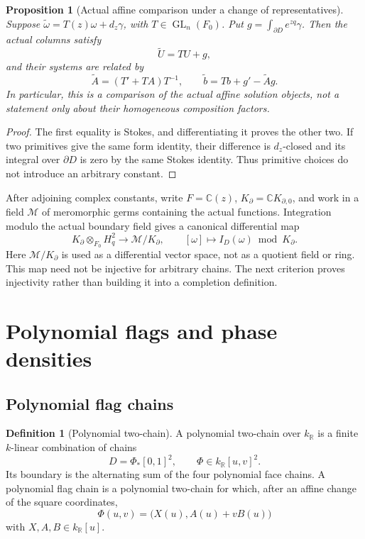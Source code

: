 \documentclass[11pt]{article}
\numberwithin{equation}{section}
\newtheorem{proposition}[proposition]{Proposition}
\theoremstyle{definition}
\newtheorem{definition}[definition]{Definition}
\theoremstyle{remark}
\newcommand{\C}{\mathbb C}
\newcommand{\R}{\mathbb R}
\newcommand{\GL}{\operatorname{GL}}
\newcommand{\Hq}{H_q^2}
\newcommand{\M}{\mathscr M}
\begin{document}
\begin{proposition}[Actual affine comparison under a change of representatives]
\label{prop:gauge}
Suppose
$\widetilde\omega=T(z)\omega+d_z\gamma$, with $T\in\GL_n(F_0)$.
Put $g=\int_{\partial D}e^{zq}\gamma$. Then the actual columns satisfy
\[
 \widetilde U=TU+g,
\]
and their systems are related by
\[
 \widetilde A=(T'+TA)T^{-1},\qquad
 \widetilde b=Tb+g'-\widetilde A g.
\]
In particular, this is a comparison of the actual affine solution objects,
not a statement only about their homogeneous composition factors.
\end{proposition}
\begin{proof}
The first equality is Stokes, and differentiating it proves the other two.
If two primitives give the same form identity, their difference is
$d_z$-closed and its integral over $\partial D$ is zero by the same Stokes
identity. Thus primitive choices do not introduce an arbitrary constant.
\end{proof}

After adjoining complex constants, write $F=\C(z)$,
$K_\partial=\C K_{\partial,0}$, and work in a field $\M$ of meromorphic
germs containing the actual functions. Integration modulo the actual
boundary field gives a canonical differential map
\begin{equation}\label{eq:canonical-comparison}
 K_\partial\otimes_{F_0}\Hq\longrightarrow\M/K_\partial,
 \qquad [\omega]\longmapsto I_D(\omega)\bmod K_\partial.
\end{equation}
Here $\M/K_\partial$ is used as a differential vector space, not as a
quotient field or ring. This map need not be injective for arbitrary chains.
The next criterion proves injectivity rather than building it into a
completion definition.

\section{Polynomial flags and phase densities}\label{sec:flags}

\subsection{Polynomial flag chains}

\begin{definition}[Polynomial two-chain]\label{def:poly-chain}
A polynomial two-chain over $k_{\R}$ is a finite $k$-linear combination of
chains
\[
  D=\Phi_*[0,1]^2,
  \qquad
  \Phi\in k_{\R}[u,v]^2.
\]
Its boundary is the alternating sum of the four polynomial face chains.
A polynomial flag chain is a polynomial two-chain for which, after an affine
change of the square coordinates,
\[
  \Phi(u,v)=\bigl(X(u),A(u)+vB(u)\bigr)
\]
with $X,A,B\in k_{\R}[u]$.
\end{definition}
\end{document}
